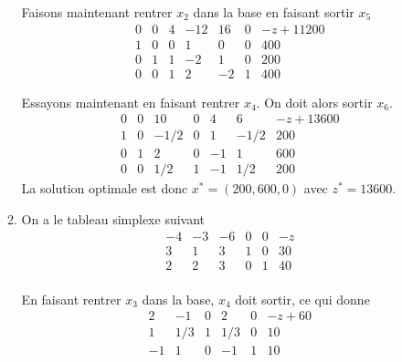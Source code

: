 \begin{enumerate}
\begin{solution}
\begin{enumerate}
          Faisons maintenant rentrer $x_2$ dans la base en faisant sortir $x_5$
          \[
            \begin{array}{cccccc|l}
              0 & 0 & 4 & -12 & 16 & 0 & -z+11200\\
              \hline
              1 & 0 & 0 &   1 &  0 & 0 & 400\\
              0 & 1 & 1 &  -2 &  1 & 0 & 200\\
              0 & 0 & 1 &   2 & -2 & 1 & 400
            \end{array}
          \]

          Essayons maintenant en faisant rentrer $x_4$.
          On doit alors sortir $x_6$.
          \[
            \begin{array}{cccccc|l}
              0 & 0 &  10  & 0 &  4 &  6   & -z+13600\\
              \hline
              1 & 0 & -1/2 & 0 &  1 & -1/2 & 200\\
              0 & 1 &  2   & 0 & -1 &  1   & 600\\
              0 & 0 &  1/2 & 1 & -1 &  1/2 & 200
            \end{array}
          \]
          La solution optimale est donc $x^* = (200,600,0)$ avec $z^* = 13600$.
        \item
          On a le tableau simplexe suivant
          \[
            \begin{array}{ccccc|l}
              -4 & -3 & -6 & 0 & 0 & -z\\
              \hline
               3 &  1 &  3 & 1 & 0 & 30\\
               2 &  2 &  3 & 0 & 1 & 40\\
            \end{array}
          \]

          En faisant rentrer $x_3$ dans la base,
          $x_4$ doit sortir, ce qui donne
          \[
            \begin{array}{ccccc|l}
               2 & -1   & 0 & 2   & 0 & -z+60\\
              \hline
               1 &  1/3 & 1 & 1/3 & 0 & 10\\
              -1 &  1   & 0 & -1  & 1 & 10\\
            \end{array}
          \]


\end{enumerate}
\end{solution}
\end{enumerate}
